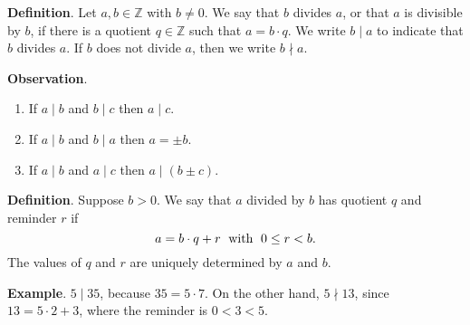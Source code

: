 \documentclass[10pt,varwidth=6in,margin=0.2in,preview]{standalone}
\begin{document}
\begin{flushleft}

\textbf{Definition}. Let $a, b \in \mathbb{Z}$ with $b \neq 0$. We say that $b$ divides $a$, or that $a$ is divisible by $b$, if there is a quotient $q \in \mathbb{Z}$ such that $a = b \cdot q$. We write $b \mid a$ to indicate that $b$ divides $a$. If $b$ does not divide $a$, then we write $b \nmid a$.

\textbf{Observation}.

\begin{enumerate}[label=(\alph*)]
\item If $a \mid b$ and $b \mid c$ then $a \mid c$.
\item If $a \mid b$ and $b \mid a$ then $a = \pm b$.
\item If $a \mid b$ and $a \mid c$ then $a \mid (b \pm c)$.
\end{enumerate}

\textbf{Definition}. Suppose $b > 0$. We say that $a$ divided by $b$ has quotient $q$ and reminder $r$ if
\[a = b \cdot q + r \text{\; with\; } 0 \le r < b.\]
The values of $q$ and $r$ are uniquely determined by $a$ and $b$. 

\textbf{Example}. $5 \mid 35$, because $35 = 5 \cdot 7$. On the other hand, $5 \nmid 13$, since $13 = 5 \cdot 2 + 3$, where the reminder is $0 < 3 < 5$.


\end{flushleft}
\end{document}
